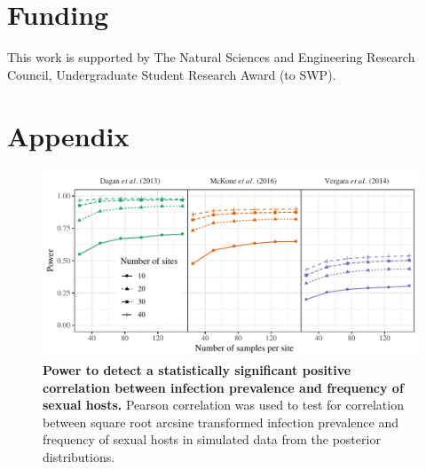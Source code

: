 \documentclass{article}\usepackage[]{graphicx}\usepackage[]{color}
\begin{document}
\section{Funding}

This work is supported by The Natural Sciences and Engineering Research Council, Undergraduate Student Research Award (to SWP).



\pagebreak
\section*{Appendix}

\renewcommand\thefigure{A\arabic{figure}}    
\setcounter{figure}{0}   

\begin{figure}[!ht]
\includegraphics[width=\textwidth]{../fig/power_lm.pdf}
\caption{{\bf Power to detect a statistically significant positive correlation between infection prevalence and frequency of sexual hosts.}
Pearson correlation was used to test for correlation between square root arcsine transformed infection prevalence and frequency of sexual hosts in simulated data from the posterior distributions.
}
\label{fig:power_lm}
\end{figure}
\end{document}
